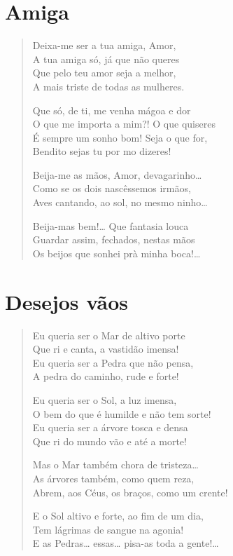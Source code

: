 \chapter{Amiga}

\begin{verse}
Deixa-me ser a tua amiga, Amor,\\
A tua amiga só, já que não queres\\
Que pelo teu amor seja a melhor,\\
A mais triste de todas as mulheres.

Que só, de ti, me venha mágoa e dor\\
O que me importa a mim?! O que quiseres\\
É sempre um sonho bom! Seja o que for,\\
Bendito sejas tu por mo dizeres!

Beija-me as mãos, Amor, devagarinho\ldots{}\\
Como se os dois nascêssemos irmãos,\\
Aves cantando, ao sol, no mesmo ninho\ldots{}

Beija-mas bem!\ldots{} Que fantasia louca\\
Guardar assim, fechados, nestas mãos\\
Os beijos que sonhei prà minha boca!\ldots{} 
\end{verse}

\chapter{Desejos vãos}

\begin{verse}
Eu queria ser o Mar de altivo porte\\
Que ri e canta, a vastidão imensa!\\
Eu queria ser a Pedra que não pensa,\\
A pedra do caminho, rude e forte!

Eu queria ser o Sol, a luz imensa,\\
O bem do que é humilde e não tem sorte!\\
Eu queria ser a árvore tosca e densa\\
Que ri do mundo vão e até a morte!

Mas o Mar também chora de tristeza\ldots{}\\
As árvores também, como quem reza,\\
Abrem, aos Céus, os braços, como um crente!

E o Sol altivo e forte, ao fim de um dia,\\
Tem lágrimas de sangue na agonia!\\
E as Pedras\ldots{} essas\ldots{} pisa-as toda a gente!\ldots{} 
\end{verse}

